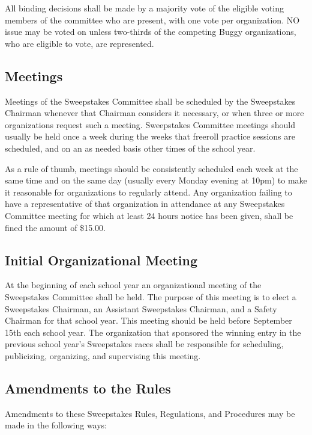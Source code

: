 	All binding decisions shall be made by a majority vote of the eligible voting
	members of the committee who are present, with one vote per organization. NO
	issue may be voted on unless two-thirds of the competing Buggy organizations,
	who are eligible to vote, are represented.

\subsection{Meetings}

	Meetings of the Sweepstakes Committee shall be scheduled by the Sweepstakes
	Chairman whenever that Chairman considers it necessary, or when
	three or more organizations request such a meeting. Sweepstakes Committee
	meetings should usually be held once a week during the weeks that freeroll
	practice sessions are scheduled, and on an as needed basis other times of the
	school year.

	As a rule of thumb, meetings should be consistently scheduled each week at the
	same time and on the same day (usually every Monday evening at 10pm) to make it
	reasonable for organizations to regularly attend. Any organization failing to
	have a representative of that organization in attendance at any Sweepstakes
	Committee meeting for which at least 24 hours notice has been given, shall be
	fined the amount of \$15.00.

\subsection{Initial Organizational Meeting}

	At the beginning of each school year an organizational meeting of the
	Sweepstakes Committee shall be held. The purpose of this meeting is to elect a
	Sweepstakes Chairman, an Assistant Sweepstakes Chairman, and a Safety Chairman
	for that school year. This meeting should be held before September 15th each
	school year. The organization that sponsored the winning entry in the previous
	school year's Sweepstakes races shall be responsible for scheduling,
	publicizing, organizing, and supervising this meeting.

\subsection{Amendments to the Rules}

	Amendments to these Sweepstakes Rules, Regulations, and Procedures may be made
	in the following ways:

